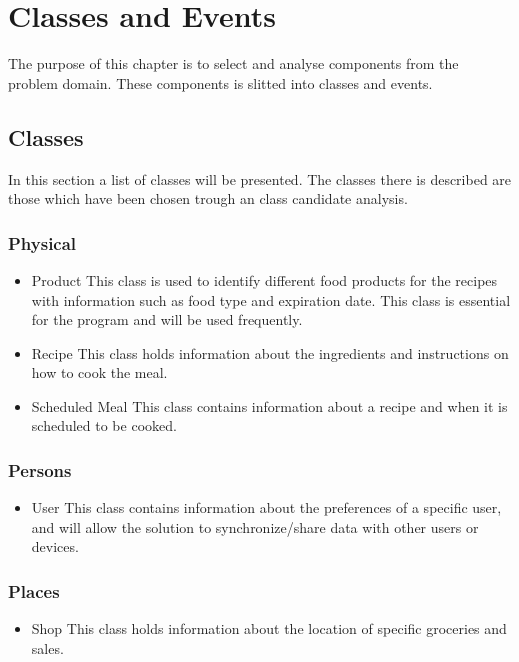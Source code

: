 \chapter{Classes and Events}
The purpose of this chapter is to select and analyse components from the problem domain. These components is slitted into classes and events.

\section{Classes}
In this section a list of classes will be presented. The classes there is described are those which have been chosen trough an class candidate analysis.

\subsection{Physical}
\begin{itemize}
\item Product
	\subitem This class is used to identify different food products for the recipes with information such as food type and expiration date. This class is essential for the program and will be used frequently.
\item Recipe
	\subitem This class holds information about the ingredients and instructions on how to cook the meal.
\item Scheduled Meal
	\subitem This class contains information about a recipe and when it is scheduled to be cooked.
\end{itemize}

\subsection{Persons}
\begin{itemize}
\item User
	\subitem This class contains information about the preferences of a specific user, and will allow the solution to synchronize/share data with other users or devices.
\end{itemize}

\subsection{Places}
\begin{itemize}
\item Shop
	\subitem This class holds information about the location of specific groceries and sales.
\end{itemize}

